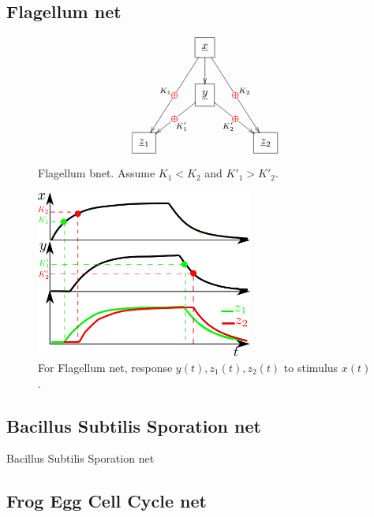\newpage
\subsection{Flagellum net}

\begin{figure}[h!]
$$
\xymatrix@C=3pc{
&\Rect{\rvx}\ar[d]
\ar[ddl]|\redoplus_{K_1}
\ar[ddr]|\redoplus^{K_2}
\\
&\Rect{\rvy}\ar[dl]|\redoplus^{K'_1}
\ar[dr]|\redoplus_{K'_2}
\\
\Rect{\rvz_1}&
&\Rect{\rvz_2}
}
$$
\caption{Flagellum bnet. Assume $K_1<K_2$ and $K'_1 > K'_2$.}
\label{fig-flagellum}
\end{figure}

\begin{figure}[h!]
\centering
\includegraphics[width=2.8in]
{autoregulons/flagellum.png}
\caption{For Flagellum net, response  $y(t), z_1(t), z_2(t)$ to stimulus $x(t)$.}
\label{fig-flagellum-net}
\end{figure}


\subsection{Bacillus Subtilis Sporation net}

\beq
{}
\eeq
Bacillus Subtilis  Sporation net


\subsection{Frog Egg Cell Cycle net}



